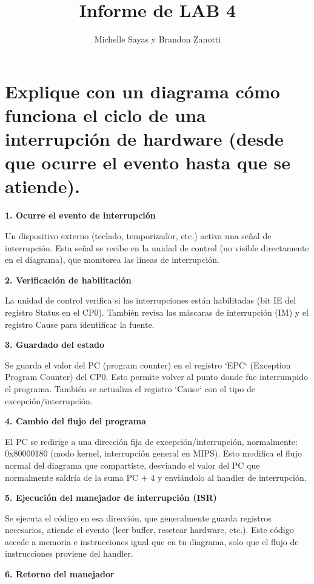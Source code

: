 \documentclass[]{article}
\title{Informe de LAB 4}
\author{Michelle Sayas y Brandon Zanotti}
\begin{document}
\maketitle

\begin{abstract}

\end{abstract}

\section{Explique con un diagrama cómo funciona el ciclo de una interrupción de hardware (desde que ocurre el evento hasta que se atiende).}
 \textbf{1. Ocurre el evento de interrupción}
 
 Un dispositivo externo (teclado, temporizador, etc.) activa una señal de interrupción. Esta señal se recibe en la unidad de control (no visible directamente en el diagrama), que monitorea las líneas de interrupción.

 \textbf{2. Verificación de habilitación}

 La unidad de control verifica si las interrupciones están habilitadas (bit IE del registro Status en el CP0). También revisa las máscaras de interrupción (IM) y el registro Cause para identificar la fuente.

 \textbf{3. Guardado del estado}

 Se guarda el valor del PC (program counter) en el registro `EPC` (Exception Program Counter) del CP0. Esto permite volver al punto donde fue interrumpido el programa. También se actualiza el registro `Cause` con el tipo de excepción/interrupción.

 \textbf{4. Cambio del flujo del programa}

 El PC se redirige a una dirección fija de excepción/interrupción, normalmente: 0x80000180 (modo kernel, interrupción general en MIPS).
 Esto modifica el flujo normal del diagrama que compartiste, desviando el valor del PC que normalmente saldría de la suma PC + 4 y enviándolo al handler de interrupción.

 \textbf{5. Ejecución del manejador de interrupción (ISR)}

 Se ejecuta el código en esa dirección, que generalmente guarda registros necesarios, atiende el evento (leer buffer, resetear hardware, etc.). Este código accede a memoria e instrucciones igual que en tu diagrama, solo que el flujo de instrucciones proviene del handler.

 \textbf{6. Retorno del manejador}
\end{document}
